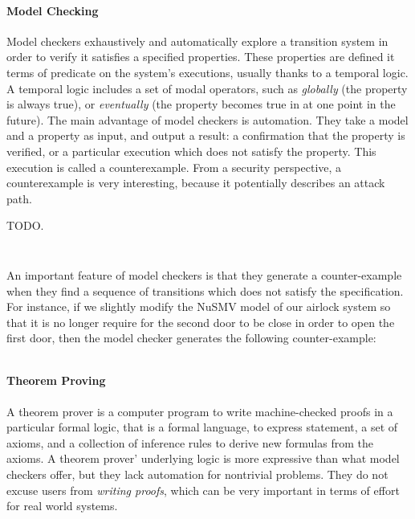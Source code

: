 \paragraph{Model Checking}
%
Model checkers exhaustively and automatically explore a transition system in
order to verify it satisfies a specified properties.
%
These properties are defined it terms of predicate on the system's executions,
usually thanks to a temporal logic.
%
A temporal logic includes a set of modal operators, such as \emph{globally} (the
property is always true), or \emph{eventually} (the property becomes true in at
one point in the future).
%
The main advantage of model checkers is automation.
%
They take a model and a property as input, and output a result: a confirmation
that the property is verified, or a particular execution which does not satisfy
the property.
%
This execution is called a counterexample.
%
From a security perspective, a counterexample is very interesting, because it
potentially describes an attack path.

\begin{example}
  TODO.

  \inputminted[frame=single]{coq}{Listings/Airlock1.nusmv}
  \inputminted[frame=single]{coq}{Listings/Airlock-out.nusmv}

  An important feature of model checkers is that they generate a counter-example
  when they find a sequence of transitions which does not satisfy the
  specification.
  For instance, if we slightly modify the NuSMV model of our airlock system so
  that it is no longer require for the second door to be close in order to open
  the first door, then the model checker generates the following
  counter-example:

  \inputminted[frame=single]{coq}{Listings/Airlock-counter.nusmv}
\end{example}

\paragraph{Theorem Proving}
%
A theorem prover is a computer program to write machine-checked proofs in a
particular formal logic, that is a formal language, to express statement, a set
of axioms, and a collection of inference rules to derive new formulas from the
axioms.
%
A theorem prover' underlying logic is more expressive than what model checkers
offer, but they lack automation for nontrivial problems.
%
They do not excuse users from \emph{writing proofs}, which can be very important
in terms of effort for real world systems.

